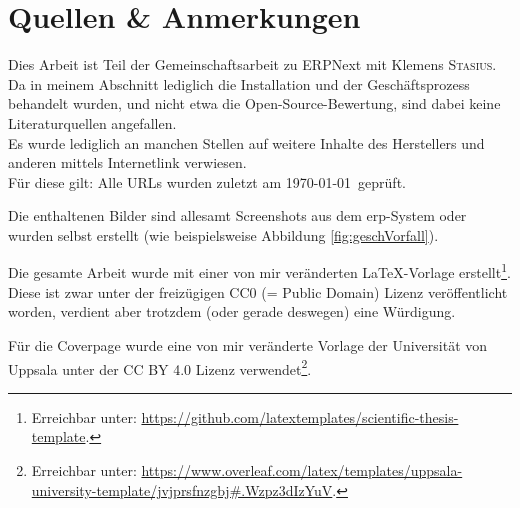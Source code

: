 \chapter{Quellen \& Anmerkungen}
Dies Arbeit ist Teil der Gemeinschaftsarbeit zu ERPNext mit Klemens \textsc{Stasius}. Da in meinem Abschnitt lediglich die Installation und der Geschäftsprozess behandelt wurden, und nicht etwa die Open-Source-Bewertung, sind dabei keine Literaturquellen angefallen. \\
Es wurde lediglich an manchen Stellen auf weitere Inhalte des Herstellers und anderen mittels Internetlink verwiesen. \\
Für diese gilt: Alle URLs wurden zuletzt am \today\ geprüft.

Die enthaltenen Bilder sind allesamt Screenshots aus dem \gls{erp}-System oder wurden selbst erstellt (wie beispielsweise Abbildung \ref{fig:geschVorfall}).

Die gesamte Arbeit wurde mit einer von mir veränderten \LaTeX-Vorlage erstellt\footnote{Erreichbar unter: \url{https://github.com/latextemplates/scientific-thesis-template}.}. Diese ist zwar unter der freizügigen CC0 (= Public Domain) Lizenz veröffentlicht worden, verdient aber trotzdem (oder gerade deswegen) eine Würdigung.

Für die Coverpage wurde eine von mir veränderte Vorlage der Universität von Uppsala unter der CC BY 4.0 Lizenz verwendet\footnote{Erreichbar unter: \url{https://www.overleaf.com/latex/templates/uppsala-university-template/jvjprsfnzgbj#.Wzpz3dIzYuV}.}.